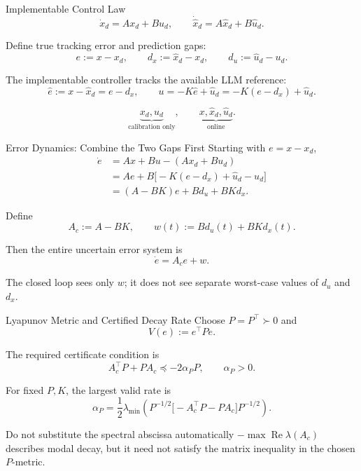 \documentclass[aspectratio=43,11pt]{beamer}
\newcommand{\xd}{x_d}
\newcommand{\xh}{\hat{x}_d}
\newcommand{\ud}{u_d}
\newcommand{\uh}{\hat{u}_d}
\begin{document}
\begin{frame}{Implementable Control Law}
\[
\dot \xd=A\xd+B\ud,
\qquad
\dot \xh=A\xh+B\uh.
\]

Define true tracking error and prediction gaps:
\[
e:=x-\xd,\qquad
d_x:=\xh-\xd,\qquad
d_u:=\uh-\ud.
\]

The implementable controller tracks the available LLM reference:
\[
\hat e:=x-\xh=e-d_x,
\qquad
u=-K\hat e+\uh=-K(e-d_x)+\uh.
\]

\[
\underbrace{\xd,\ud}_{\text{calibration only}},
\qquad
\underbrace{x,\xh,\uh}_{\text{online}}.
\]
\end{frame}

\begin{frame}{Error Dynamics: Combine the Two Gaps First}
Starting with $e=x-\xd$,
\begin{align*}
\dot e
&=Ax+Bu-(A\xd+B\ud)\\
&=Ae+B\big[-K(e-d_x)+\uh-\ud\big]\\
&=(A-BK)e+B d_u+BKd_x.
\end{align*}

Define
\[
A_c:=A-BK,
\qquad
\boxed{w(t):=B d_u(t)+BKd_x(t)}.
\]

Then the entire uncertain error system is
\[
\boxed{\dot e=A_c e+w.}
\]

The closed loop sees only $w$; it does not see separate worst-case values of $d_u$ and $d_x$.
\end{frame}

\begin{frame}{Lyapunov Metric and Certified Decay Rate}
Choose $P=P^\top\succ0$ and
\[
V(e):=e^\top P e.
\]

The required certificate condition is
\[
A_c^\top P+PA_c\preceq -2\alpha_P P,
\qquad \alpha_P>0.
\]

For fixed $P,K$, the largest valid rate is
\[
\boxed{
\alpha_P=\frac{1}{2}\lambda_{\min}\!\left(
P^{-1/2}\big[-A_c^\top P-PA_c\big]P^{-1/2}
\right).}
\]

\begin{alertblock}{Do not substitute the spectral abscissa automatically}
$-\max\operatorname{Re}\lambda(A_c)$ describes modal decay, but it need not satisfy the matrix inequality in the chosen $P$-metric.
\end{alertblock}
\end{frame}
\end{document}
